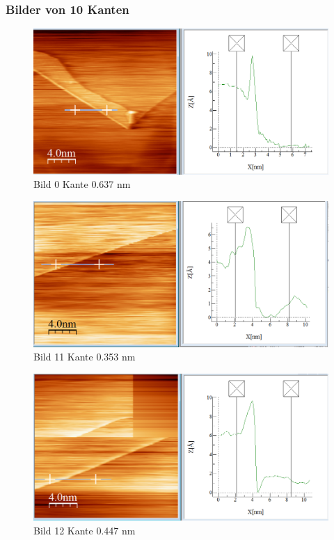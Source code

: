 \documentclass[10pt,a4paper]{article}
\begin{document}
\subsubsection{Bilder von 10 Kanten}

\begin{figure}[]
	\includegraphics[scale = 0.2]{bild00.png}
	\centering
	\caption{Bild 0 Kante 0.637 nm}
	\label{b0}
\end{figure}

\begin{figure}[]
	\includegraphics[scale = 0.2]{bild11.png}
	\centering
	\caption{Bild 11 Kante 0.353 nm}
	\label{b11}
\end{figure}
\begin{figure}[]
	\includegraphics[scale = 0.2]{bild12.png}
	\centering
	\caption{Bild 12 Kante 0.447 nm}
	\label{b12}
\end{figure}
\end{document}
